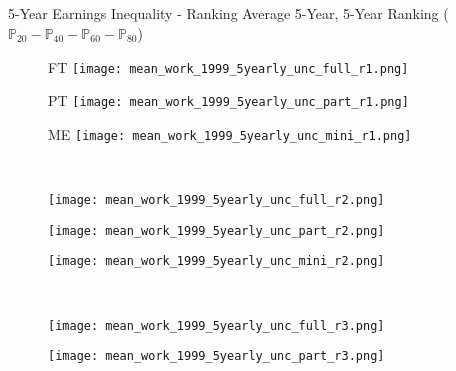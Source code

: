 \documentclass[hyperref={bookmarks=false}]{beamer}
\begin{document}
\begin{appendix}
\subsection{}

\begin{frame}
\label{RANK}
\end{frame}

\begin{frame}{5-Year Earnings Inequality - Ranking}
Average 5-Year, 5-Year Ranking ($\mathbb{P}_{20}-\mathbb{P}_{40}-\mathbb{P}_{60}-\mathbb{P}_{80}$)
\begin{figure}[!t]
\begin{minipage}[b]{0.15\textwidth}{FT}
\centering
\texttt{[image: mean\_work\_1999\_5yearly\_unc\_full\_r1.png]}
\end{minipage}
\begin{minipage}[b]{0.15\textwidth}{PT}
\centering
\texttt{[image: mean\_work\_1999\_5yearly\_unc\_part\_r1.png]}
\end{minipage}
\begin{minipage}[b]{0.15\textwidth}{ME}
\centering
\texttt{[image: mean\_work\_1999\_5yearly\_unc\_mini\_r1.png]}
\end{minipage}\\
\begin{minipage}[b]{0.15\textwidth}{}
\centering
\texttt{[image: mean\_work\_1999\_5yearly\_unc\_full\_r2.png]}
\end{minipage}
\begin{minipage}[b]{0.15\textwidth}{}
\centering
\texttt{[image: mean\_work\_1999\_5yearly\_unc\_part\_r2.png]}
\end{minipage}
\begin{minipage}[b]{0.15\textwidth}{}
\centering
\texttt{[image: mean\_work\_1999\_5yearly\_unc\_mini\_r2.png]}
\end{minipage}\\
\begin{minipage}[b]{0.15\textwidth}{}
\centering
\texttt{[image: mean\_work\_1999\_5yearly\_unc\_full\_r3.png]}
\end{minipage}
\begin{minipage}[b]{0.15\textwidth}{}
\centering
\texttt{[image: mean\_work\_1999\_5yearly\_unc\_part\_r3.png]}
\end{minipage}
\begin{minipage}[b]{0.15\textwidth}{}

\end{minipage}
\end{figure}
\end{frame}
\end{appendix}
\end{document}

